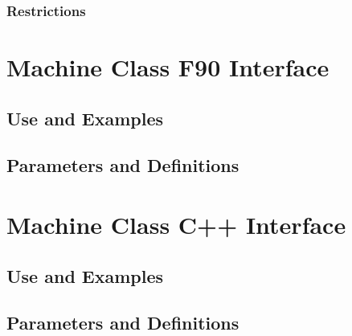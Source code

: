 \documentclass[]{article}
\begin{document}
\subsubsection{Restrictions}

%


\section{Machine Class F90 Interface}

\subsection{Use and Examples}

%


\subsection{Parameters and Definitions}

%



%


\section{Machine Class C++ Interface}

\subsection{Use and Examples}




\subsection{Parameters and Definitions}

%





\end{document}
